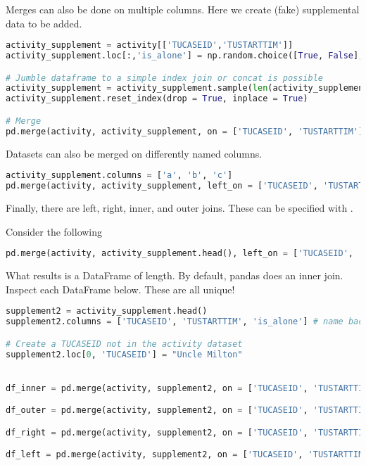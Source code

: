 Merges can also be done on multiple columns. Here we create (fake) supplemental data to be added.

\begin{lstlisting}[language = Python]
activity_supplement = activity[['TUCASEID','TUSTARTTIM']]
activity_supplement.loc[:,'is_alone'] = np.random.choice([True, False],len(activity_supplement))

# Jumble dataframe to a simple index join or concat is possible
activity_supplement = activity_supplement.sample(len(activity_supplement)) # samples without replacement to shuffle
activity_supplement.reset_index(drop = True, inplace = True)

# Merge
pd.merge(activity, activity_supplement, on = ['TUCASEID', 'TUSTARTTIM'], validate = 'one_to_one')
\end{lstlisting}

Datasets can also be merged on differently named columns.

\begin{lstlisting}[language = Python]
activity_supplement.columns = ['a', 'b', 'c']
pd.merge(activity, activity_supplement, left_on = ['TUCASEID', 'TUSTARTTIM'], right_on = ['a','b'])
\end{lstlisting}


Finally, there are left, right, inner, and outer joins. These can be specified with . 

Consider the following

\begin{lstlisting}[language = Python]
pd.merge(activity, activity_supplement.head(), left_on = ['TUCASEID', 'TUSTARTTIM'], right_on = ['a','b'])
\end{lstlisting}

What results is a DataFrame of length. By default, pandas does an inner join. Inspect each DataFrame below. These are all unique!


\begin{lstlisting}[language = Python]
supplement2 = activity_supplement.head()
supplement2.columns = ['TUCASEID', 'TUSTARTTIM', 'is_alone'] # name back

# Create a TUCASEID not in the activity dataset
supplement2.loc[0, 'TUCASEID'] = "Uncle Milton"


df_inner = pd.merge(activity, supplement2, on = ['TUCASEID', 'TUSTARTTIM'],  how = 'inner')

df_outer = pd.merge(activity, supplement2, on = ['TUCASEID', 'TUSTARTTIM'], how = 'outer')

df_right = pd.merge(activity, supplement2, on = ['TUCASEID', 'TUSTARTTIM'], how = 'right')

df_left = pd.merge(activity, supplement2, on = ['TUCASEID', 'TUSTARTTIM'], how = 'left')
\end{lstlisting}



